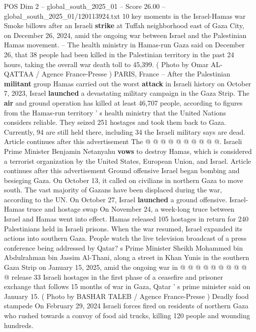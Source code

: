 \begin{textsample}{POS Dim 2 – global\_south\_2025\_01 – Score 26.00 – global\_south\_2025\_01/120113924.txt}  \label{ex:f2_pos_324}
10 key moments in the Israel-Hamas war Smoke billows after an Israeli \textbf{strike} at Tuffah neighborhood east of Gaza City, on December 26, 2024, amid the ongoing war between Israel and the Palestinian Hamas movement. -- The health ministry in Hamas-run Gaza said on December 26, that 38 people had been killed in the Palestinian territory in the past 24 hours, taking the overall war death toll to 45,399. ( Photo by Omar AL-QATTAA / Agence France-Presse ) PARIS, France -- After the Palestinian \textbf{militant} group Hamas carried out the worst \textbf{attack} in Israeli history on October 7, 2023, Israel \textbf{launched} a devastating military campaign in the Gaza Strip.
The \textbf{air} and ground operation has killed at least 46,707 people, according to figures from the Hamas-run territory ' s health ministry that the United Nations considers reliable.
They seized 251 hostages and took them back to Gaza.
Currently, 94 are still held there, including 34 the Israeli military says are dead.
Article continues after this advertisement The @ @ @ @ @ @ @ @ @ @.
Israeli Prime Minister Benjamin Netanyahu \textbf{vows} to destroy Hamas, which is considered a terrorist organization by the United States, European Union, and Israel.
Article continues after this advertisement Ground offensive Israel began bombing and besieging Gaza.
On October 13, it called on civilians in northern Gaza to move south.
The vast majority of Gazans have been displaced during the war, according to the UN.
On October 27, Israel \textbf{launched} a ground offensive.
Israel-Hamas truce and hostage swap On November 24, a week-long truce between Israel and Hamas went into effect.
Hamas released 105 hostages in return for 240 Palestinians held in Israeli prisons.
When the war resumed, Israel expanded its actions into southern Gaza.
People watch the live television broadcast of a press conference being addressed by Qatar? s Prime Minister Sheikh Mohammed bin Abdulrahman bin Jassim Al-Thani, along a street in Khan Yunis in the southern Gaza Strip on January 15, 2025, amid the ongoing war in @ @ @ @ @ @ @ @ @ @ release 33 Israeli hostages in the first phase of a ceasefire and prisoner exchange that follows 15 months of war in Gaza, Qatar ' s prime minister said on January 15. ( Photo by BASHAR TALEB / Agence France-Presse ) Deadly food stampede On February 29, 2024 Israeli forces fired on residents of northern Gaza who rushed towards a convoy of food aid trucks, killing 120 people and wounding hundreds.

\end{textsample}
